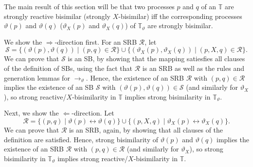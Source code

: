 %
\begin{isabellebody}%
%
%
\isadelimtheory
%
\endisadelimtheory
%
\isatagtheory
%
\endisatagtheory
{\isafoldtheory}%
%
\isadelimtheory
%
\endisadelimtheory
%
\isadelimdocument
%
\endisadelimdocument
%
\isatagdocument
%
\isamarkuptrue%
%
\endisatagdocument
{\isafolddocument}%
%
\isadelimdocument
%
\endisadelimdocument
%
\begin{isamarkuptext}%
\label{sec:reduction_bisimilarity}%
\end{isamarkuptext}\isamarkuptrue%
%
\begin{isamarkuptext}%
The main result of this section will be that two processes $p$ and $q$ of an \LTSt{} $\mathbb{T}$ are strongly reactive bisimilar (strongly $X$-bisimilar) iff the corresponding processes $\vartheta(p)$ and $\vartheta(q)$ ($\vartheta_X(p)$ and $\vartheta_X(q)$) of $\mathbb{T}_\vartheta$ are strongly bisimilar. 

We show the $\Longrightarrow$-direction first. For an SRB $\mathcal{R}$, let
$$\mathcal{S} = \{ (\vartheta(p), \vartheta(q)) \mid (p, q) \in \mathcal{R} \} \cup \{ (\vartheta_X(p), \vartheta_X(q)) \mid (p, X, q) \in \mathcal{R} \}.$$
We can prove that $\mathcal{S}$ is an SB, by showing that the mapping satiesfies all clauses of the definition of SBs, using the fact that $\mathcal{R}$ is an SRB as well as the rules and generation lemmas for $\rightarrow_\vartheta$. Hence, the existence of an SRB $\mathcal{R}$ with $(p, q) \in \mathcal{R}$ implies the existence of an SB $\mathcal{S}$ with $(\vartheta(p), \vartheta(q)) \in \mathcal{S}$ (and similarly for $\vartheta_X$), so strong reactive/$X$-bisimilarity in $\mathbb{T}$ implies strong bisimilarity in $\mathbb{T}_\vartheta$.

Next, we show the $\Longleftarrow$-direction. Let
$$\mathcal{R} = \{ (p, q) \mid \vartheta(p) \leftrightarrow \vartheta(q) \} \cup \{ (p, X, q) \mid \vartheta_X(p) \leftrightarrow \vartheta_X(q) \}.$$
We can prove that $\mathcal{R}$ is an SRB, again, by showing that all clauses of the definition are satisfied. Hence, strong bisimilarity of $\vartheta(p)$ and $\vartheta(q)$ implies the existence of an SRB $\mathcal{R}$ with $(p, q) \in \mathcal{R}$ (and similarly for $\vartheta_X$), so strong bisimilarity in $\mathbb{T}_\vartheta$ implies strong reactive/$X$-bisimilarity in $\mathbb{T}$.


\end{isamarkuptext}
\end{isabellebody}
